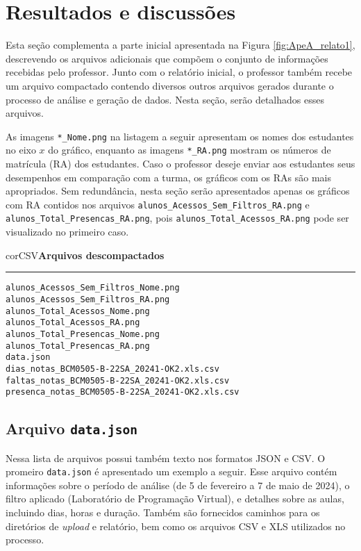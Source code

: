 \section{Resultados e discussões}\label{sec:apendice_resultados}

Esta seção complementa a parte inicial apresentada na Figura \ref{fig:ApeA_relato1}, descrevendo os arquivos adicionais que compõem o conjunto de informações recebidas pelo professor. Junto com o relatório inicial, o professor também recebe um arquivo compactado contendo diversos outros arquivos gerados durante o processo de análise e geração de dados. Nesta seção, serão detalhados esses arquivos.

As imagens \verb|*_Nome.png| na listagem a seguir apresentam os nomes dos estudantes no eixo $x$ do gráfico, enquanto as imagens \verb|*_RA.png| mostram os números de matrícula (RA) dos estudantes. Caso o professor deseje enviar aos estudantes seus desempenhos em comparação com a turma, os gráficos com os RAs são mais apropriados. Sem redundância, nesta seção serão apresentados apenas os gráficos com RA contidos nos arquivos \verb|alunos_Acessos_Sem_Filtros_RA.png| e \verb|alunos_Total_Presencas_RA.png|, pois \verb|alunos_Total_Acessos_RA.png| pode ser visualizado no primeiro caso.

\begin{myboxCode}{corCSV}{\textbf{Arquivos descompactados}}\vspace{3mm}
\hrule
\begin{verbatim}
alunos_Acessos_Sem_Filtros_Nome.png
alunos_Acessos_Sem_Filtros_RA.png
alunos_Total_Acessos_Nome.png
alunos_Total_Acessos_RA.png
alunos_Total_Presencas_Nome.png
alunos_Total_Presencas_RA.png
data.json
dias_notas_BCM0505-B-22SA_20241-OK2.xls.csv
faltas_notas_BCM0505-B-22SA_20241-OK2.xls.csv
presenca_notas_BCM0505-B-22SA_20241-OK2.xls.csv
\end{verbatim}
\end{myboxCode}


\subsection{Arquivo \texttt{data.json}}

Nessa lista de arquivos possui também texto nos formatos JSON e CSV. O promeiro \verb|data.json| é apresentado um exemplo a seguir. Esse arquivo contém informações sobre o período de análise (de 5 de fevereiro a 7 de maio de 2024), o filtro aplicado (Laboratório de Programação Virtual), e detalhes sobre as aulas, incluindo dias, horas e duração. Também são fornecidos caminhos para os diretórios de \textit{upload} e relatório, bem como os arquivos CSV e XLS utilizados no processo.


